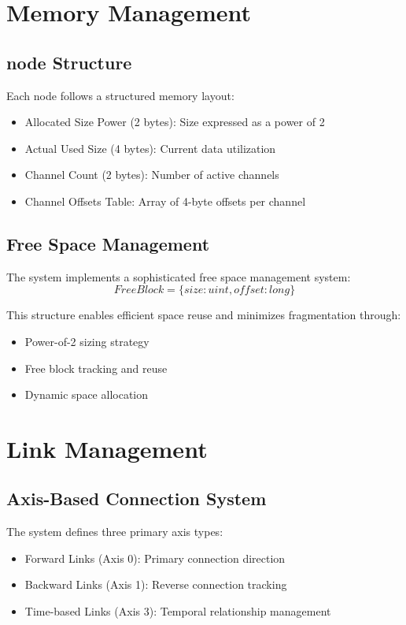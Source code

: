 \section{Memory Management}\label{Sec:Memory}
\subsection{node Structure}
Each node follows a structured memory layout:
\begin{itemize}
    \item Allocated Size Power (2 bytes): Size expressed as a power of 2
    \item Actual Used Size (4 bytes): Current data utilization
    \item Channel Count (2 bytes): Number of active channels
    \item Channel Offsets Table: Array of 4-byte offsets per channel
\end{itemize}

\subsection{Free Space Management}
The system implements a sophisticated free space management system:
\begin{equation}
    FreeBlock = \{size: uint, offset: long\}
\end{equation}

This structure enables efficient space reuse and minimizes fragmentation through:
\begin{itemize}
    \item Power-of-2 sizing strategy
    \item Free block tracking and reuse
    \item Dynamic space allocation
\end{itemize}

\section{Link Management}\label{Sec:Links}
\subsection{Axis-Based Connection System}
The system defines three primary axis types:
\begin{itemize}
    \item Forward Links (Axis 0): Primary connection direction
    \item Backward Links (Axis 1): Reverse connection tracking
    \item Time-based Links (Axis 3): Temporal relationship management
\end{itemize}

